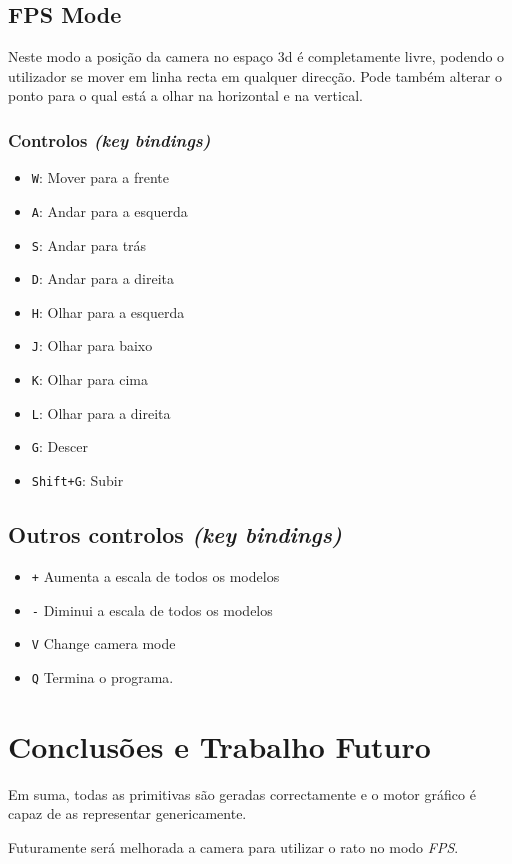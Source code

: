\documentclass[a4paper]{article}
\begin{document}
\subsection{FPS Mode}

Neste modo a posição da camera no espaço 3d é completamente livre, podendo o utilizador se mover em linha recta em qualquer direcção. Pode também alterar o ponto para o qual está a olhar na horizontal e na vertical.
\subsubsection{Controlos \textit{(key bindings)}}

\begin{itemize}
    \item \texttt{W}: Mover para a frente
    \item \texttt{A}: Andar para a esquerda
    \item \texttt{S}: Andar para trás
    \item \texttt{D}: Andar para a direita
    \item \texttt{H}: Olhar para a esquerda
    \item \texttt{J}: Olhar para baixo
    \item \texttt{K}: Olhar para cima
    \item \texttt{L}: Olhar para a direita
    \item \texttt{G}: Descer
    \item \texttt{Shift+G}: Subir
\end{itemize}


\subsection{Outros controlos \textit{(key bindings)}}

\begin{itemize}
    \item \texttt{+} Aumenta a escala de todos os modelos
    \item \texttt{-} Diminui a escala de todos os modelos
    \item \texttt{V} Change camera mode
    \item \texttt{Q} Termina o programa.
\end{itemize}

\section{Conclusões e Trabalho Futuro}
Em suma, todas as primitivas são geradas correctamente e o motor gráfico é capaz de as representar genericamente.

Futuramente será melhorada a camera para utilizar o rato no modo \textit{FPS}.
\end{document}

